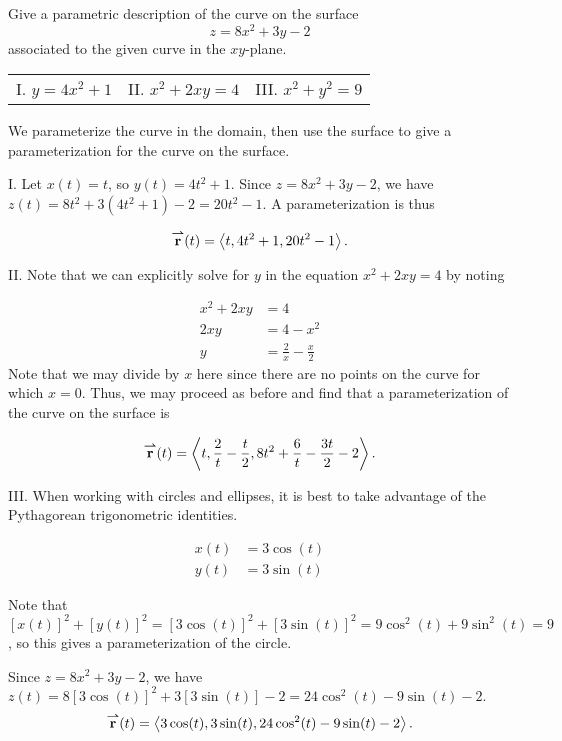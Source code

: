 \documentclass[noauthor]{ximera}
\begin{document}
\begin{problem}
Give a parametric description of the curve on the surface \[z=8x^2+3y-2\] associated to the given curve in the $xy$-plane.

\begin{center}
\begin{tabular}{lll}
I. $y=4x^2+1$ \hspace{15mm} & II. $x^2+2xy=4$ \hspace{15mm} & III. $x^2+y^2=9$
\end{tabular}
\end{center}

\begin{freeResponse}
We parameterize the curve in the domain, then use the surface to give a parameterization for the curve on the surface.

I. Let $x(t)=t$, so $y(t) =4t^2+1$.  Since $z=8x^2+3y-2$, we have $z(t) = 8t^2+3(4t^2+1)-2 = 20t^2-1.$  A parameterization is thus

\[
{\overset{\boldsymbol{\rightharpoonup}}{\mathbf{r}}}(t) = \left\langle  t, 4t^2+1, 20t^2-1\right\rangle.
\]

II. Note that we can explicitly solve for $y$ in the equation $x^2+2xy=4$ by noting

\begin{align*}
x^2+2xy&=4\\
2xy&=4-x^2 \\
y &= \frac{2}{x}-\frac{x}{2}
\end{align*}
Note that we may divide by $x$ here since there are no points on the curve for which $x=0$.  Thus, we may proceed as before and find that a parameterization of the curve on the surface is

\[
{\overset{\boldsymbol{\rightharpoonup}}{\mathbf{r}}}(t) = \left\langle  t, \frac{2}{t}-\frac{t}{2}, 8t^2+ \frac{6}{t}-\frac{3t}{2}-2\right\rangle.
\]

III. When working with circles and ellipses, it is best to take advantage of the Pythagorean trigonometric identities.

\begin{align*}
x(t) &= 3\cos(t) \\
y(t) &= 3\sin(t)
\end{align*}

Note that $[x(t)]^2+[y(t)]^2 = [3\cos(t)]^2+[3\sin(t)]^2 = 9\cos^2(t) + 9\sin^2(t) = 9$, so this gives a parameterization of the circle.

Since $z=8x^2+3y-2$, we have $z(t) = 8[3\cos(t)]^2+3[3\sin(t)]-2 = 24\cos^2(t)-9\sin(t)-2.$
\[
{\overset{\boldsymbol{\rightharpoonup}}{\mathbf{r}}}(t) = \left\langle 3\cos(t), 3\sin(t), 24\cos^2(t)-9\sin(t)-2\right\rangle.
\]

\end{freeResponse}
\end{problem}
\end{document}
